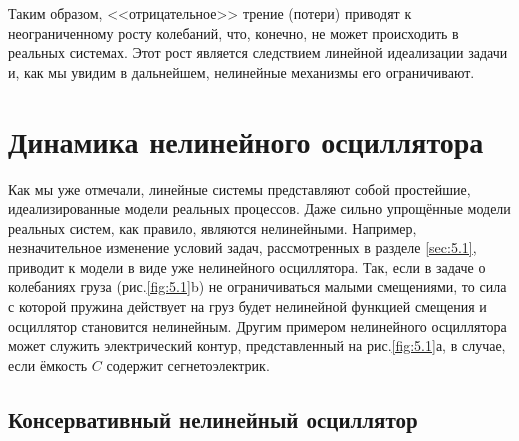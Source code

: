 Таким образом, <<отрицательное>> трение (потери) приводят к
неограниченному росту колебаний, что, конечно, не может происходить в
реальных системах. Этот рост является следствием линейной идеализации
задачи и, как мы увидим в дальнейшем, нелинейные механизмы его
ограничивают.

\section{Динамика нелинейного осциллятора}%
\label{sec:5.2}

Как мы уже отмечали, линейные системы представляют собой
простейшие, идеализированные модели реальных процессов. Даже сильно
упрощённые модели реальных систем, как правило, являются нелинейными.
Например, незначительное изменение условий задач, рассмотренных в разделе
\ref{sec:5.1}, приводит к модели в виде уже нелинейного осциллятора. Так, если в задаче
о колебаниях груза (рис.\ref{fig:5.1}b) не ограничиваться малыми смещениями, то сила с
которой пружина действует на груз будет нелинейной функцией смещения и
осциллятор становится нелинейным. Другим примером нелинейного
осциллятора может служить электрический контур, представленный на
рис.\ref{fig:5.1}а, в случае, если ёмкость $C$ содержит сегнетоэлектрик.
\subsection{Консервативный нелинейный осциллятор}%
\label{sub:5.2.1}

